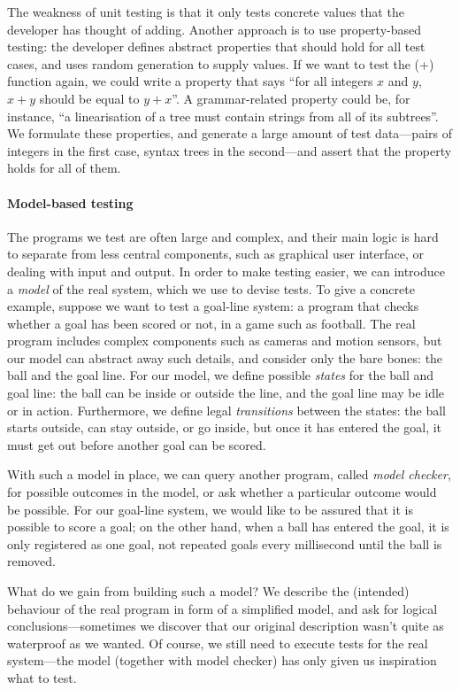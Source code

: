 The weakness of unit testing is that it only tests concrete values
that the developer has thought of adding. Another approach is to use
property-based testing: the developer defines abstract properties that
should hold for all test cases, and uses random generation to supply
values. If we want to test the (+) function again, we could write a
property that says ``for all integers $x$ and $y$, $x+y$ should be
equal to $y+x$''.  A grammar-related property could be, for instance,
``a linearisation of a tree must contain strings from all of its
subtrees''.  We formulate these properties, and generate a large
amount of test data---pairs of integers in the first case, syntax trees in
the second---and assert that the property holds for all of them.

\paragraph{Model-based testing}
The programs we test are often large and complex, and their main logic is hard to
separate from less central components, such as graphical user interface, or
dealing with input and output. In order to make testing easier, we can introduce
a \emph{model} of the real system, which we use to devise tests. To give a concrete
example, suppose we want to test a goal-line system: a program that checks whether
a goal has been scored or not, in a game such as football. The real program includes
complex components such as cameras and motion sensors, but our model can abstract
away such details, and consider only the bare bones: the ball and the goal line.
For our model, we define possible \emph{states} for the ball and goal line: the
ball can be inside or outside the line, and the goal line may be idle or in action.
Furthermore, we define legal \emph{transitions} between the states: the ball starts
outside, can stay outside, or go inside, but once it has entered the goal, it must
get out before another goal can be scored.

With such a model in place, we can query another program, called \emph{model checker},
for possible outcomes in the model, or ask whether a particular outcome would be
possible. For our goal-line system, we would like to be assured that it is possible
to score a goal; on the other hand, when a ball has entered the goal, it is only
registered as one goal, not repeated goals every millisecond until the ball is
removed.

What do we gain from building such a model? We describe the (intended) behaviour
of the real program in form of a simplified model, and ask for logical
conclusions---sometimes we discover that our original description wasn't quite
as waterproof as we wanted. Of course, we still need to execute tests for the
real system---the model (together with model checker) has only given us inspiration
what to test.

